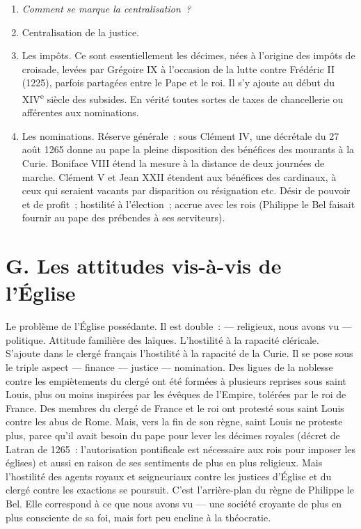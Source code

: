 \documentclass[french,twoside]{book} %
\newlength{\listmod}
\newcommand{\listhead}[1]{\hspace{-1\listmod}\emph{#1}}
\newcommand\chapterclose{} %
\begin{document}
\begin{enumerate}[itemsep=0pt,]
\item[]\listhead{Comment se marque la centralisation ?}
\item Centralisation de la justice.
\item Les impôts. Ce sont essentiellement les décimes, nées à l’origine des impôts de croisade, levées par Grégoire IX à l’occasion de la lutte contre Frédéric II (1225), parfois partagées entre le Pape et le roi. Il s’y ajoute au début du XIV\textsuperscript{e} siècle des subsides. En vérité toutes sortes de taxes de chancellerie ou afférentes aux nominations.
\item Les nominations. Réserve générale : sous Clément IV, une décrétale du 27 août 1265 donne au pape la pleine disposition des bénéfices des mourants à la Curie. Boniface VIII étend la mesure à la distance de deux journées de marche. Clément V et Jean XXII étendent aux bénéfices des cardinaux, à ceux qui seraient vacants par disparition ou résignation etc. Désir de pouvoir et de profit ; hostilité à l’élection ; accrue avec les rois (Philippe le Bel faisait fournir au pape des prébendes à ses serviteurs).
\end{enumerate}

\section[{G. Les attitudes vis-à-vis de l’Église}]{G. Les attitudes vis-à-vis de l’Église}
\label{c10g}
\noindent Le problème de l’Église possédante. Il est double : — religieux, nous avons vu — politique. Attitude familière des laïques. L’hostilité à la rapacité cléricale. S’ajoute dans le clergé français l’hostilité à la rapacité de la Curie. Il se pose sous le triple aspect — finance — justice — nomination. Des ligues de la noblesse contre les empiètements du clergé ont été formées à plusieurs reprises sous saint Louis, plus ou moins inspirées par les évêques de l’Empire, tolérées par le roi de France. Des membres du clergé de France et le roi ont protesté sous saint Louis contre les abus de Rome. Mais, vers la fin de son règne, saint Louis ne proteste plus, parce qu’il avait besoin du pape pour lever les décimes royales (décret de Latran de 1265 : l’autorisation pontificale est nécessaire aux rois pour imposer les églises) et aussi en raison de ses sentiments de plus en plus religieux. Mais l’hostilité des agents royaux et seigneuriaux contre les justices d’Église et du clergé contre les exactions se poursuit. C’est l’arrière-plan du règne de Philippe le Bel. Elle correspond à ce que nous avons vu — une société croyante de plus en plus consciente de sa foi, mais fort peu encline à la théocratie.
\chapterclose
\end{document}
